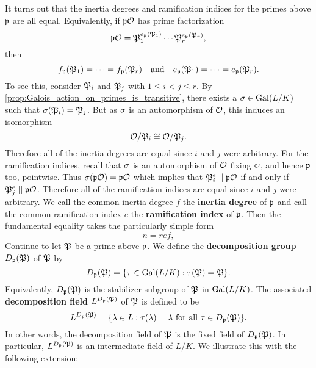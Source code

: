     It turns out that the inertia degrees and ramification indices for the primes above $\mathfrak{p}$ are all equal. Equivalently, if $\mathfrak{p}\mathcal{O}$ has prime factorization
    \[
      \mathfrak{p}\mathcal{O} = \mathfrak{P}_{1}^{e_{\mathfrak{p}}(\mathfrak{P}_{1})} \cdots \mathfrak{P}_{r}^{e_{\mathfrak{p}}(\mathfrak{P}_{r})},
    \]
    then
    \[
      f_{\mathfrak{p}}(\mathfrak{P}_{1}) = \cdots = f_{\mathfrak{p}}(\mathfrak{P}_{r}) \quad \text{and} \quad e_{\mathfrak{p}}(\mathfrak{P}_{1}) = \cdots = e_{\mathfrak{p}}(\mathfrak{P}_{r}).
    \]
    To see this, consider $\mathfrak{P}_{i}$ and $\mathfrak{P}_{j}$ with $1 \le i < j \le r$. By \cref{prop:Galois_action_on_primes_is_transitive}, there exists a $\sigma \in \operatorname{\mathrm{Gal}}(L/K)$ such that $\sigma(\mathfrak{P}_{i}) = \mathfrak{P}_{j}$. But as $\sigma$ is an automorphism of $\mathcal{O}$, this induces an isomorphism
    \[
      \mathcal{O}/\mathfrak{P}_{i} \cong \mathcal{O}/\mathfrak{P}_{j}.
    \]
    Therefore all of the inertia degrees are equal since $i$ and $j$ were arbitrary. For the ramification indices, recall that $\sigma$ is an automorphism of $\mathcal{O}$ fixing $\smc{O}$, and hence $\mathfrak{p}$ too, pointwise. Thus $\sigma(\mathfrak{p}\mathcal{O}) = \mathfrak{p}\mathcal{O}$ which implies that $\mathfrak{P}_{i}^{e} \mid\mid \mathfrak{p}\mathcal{O}$ if and only if $\mathfrak{P}_{j}^{e} \mid\mid \mathfrak{p}\mathcal{O}$. Therefore all of the ramification indices are equal since $i$ and $j$ were arbitrary. We call the common inertia degree $f$ the \textbf{inertia degree} of $\mathfrak{p}$ and call the common ramification index $e$ the \textbf{ramification index} of $\mathfrak{p}$. Then the fundamental equality takes the particularly simple form
    \[
      n = ref,
    \]
    Continue to let $\mathfrak{P}$ be a prime above $\mathfrak{p}$. We define the \textbf{decomposition group} $D_{\mathfrak{p}}(\mathfrak{P})$ of $\mathfrak{P}$ by
    \[
      D_{\mathfrak{p}}(\mathfrak{P}) = \{\tau \in \operatorname{\mathrm{Gal}}(L/K):\tau(\mathfrak{P}) = \mathfrak{P}\}.
    \]
    Equivalently, $D_{\mathfrak{p}}(\mathfrak{P})$ is the stabilizer subgroup of $\mathfrak{P}$ in $\operatorname{\mathrm{Gal}}(L/K)$. The associated \textbf{decomposition field} $L^{D_{\mathfrak{p}}(\mathfrak{P})}$ of $\mathfrak{P}$ is defined to be
    \[
      L^{D_{\mathfrak{p}}(\mathfrak{P})} = \{\lambda \in L:\text{$\tau(\lambda) = \lambda$ for all $\tau \in D_{\mathfrak{p}}(\mathfrak{P})$}\}.
    \]
    In other words, the decomposition field of $\mathfrak{P}$ is the fixed field of $D_{\mathfrak{p}}(\mathfrak{P})$. In particular, $L^{D_{\mathfrak{p}}(\mathfrak{P})}$ is an intermediate field of $L/K$. We illustrate this with the following extension:
    
    \begin{center}
    \end{center}

